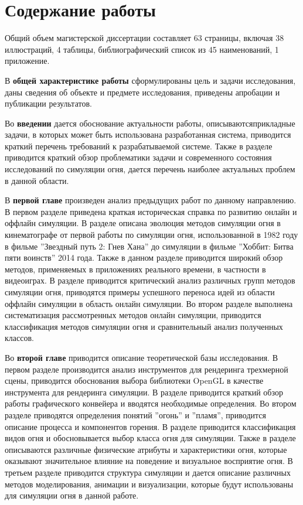 \part*{Содержание работы}

Общий объем магистерской диссертации составляет 63 страницы, включая 38
иллюстраций, 4 таблицы, библиографический список из 45 наименований, 1
приложение.

В \textbf{общей характеристике работы} сформулированы цель и задачи
исследования, даны сведения об объекте и предмете исследования, приведены
апробации и публикации результатов.

Во \textbf{введении} дается обоснование актуальности работы,
описываются\break{}прикладные задачи, в которых может быть использована
разработанная система, приводится краткий перечень требований к разрабатываемой
системе. Также в разделе приводится краткий обзор проблематики задачи и
современного состояния исследований по симуляции огня, дается перечень наиболее
актуальных проблем в данной области.

В \textbf{первой главе} произведен анализ предыдущих работ по данному
направлению. В первом разделе приведена краткая историческая справка по развитию
онлайн и оффлайн симуляции. В разделе описана эволюция методов симуляции огня в
кинематографе от первой работы по симуляции огня, использованной в 1982 году в
фильме ''Звездный путь 2: Гнев Хана'' до симуляции в фильме ''Хоббит: Битва пяти
воинств'' 2014 года. Также в данном разделе приводится широкий обзор методов,
применяемых в приложениях реального времени, в частности в видеоиграх. В разделе
приводится критический анализ различных групп методов симуляции огня, приводятся
примеры успешного переноса идей из области оффлайн симуляции в область онлайн
симуляции. Во втором разделе выполнена систематизация рассмотренных методов
онлайн симуляции, приводится классификация методов симуляции огня и
сравнительный анализ полученных классов.

Во \textbf{второй главе} приводится описание теоретической базы исследования.
В первом разделе производится анализ инструментов для рендеринга трехмерной
сцены, приводится обоснования выбора библиотеки OpenGL в качестве инструмента
для рендеринга симуляции. В разделе приводится краткий обзор работы графического
конвейера и вводятся необходимые определения. Во втором разделе
приводятся определения понятий ''огонь'' и ''пламя'', приводится описание
процесса и компонентов горения. В разделе приводится
классификация видов огня и обосновывается выбор класса огня для симуляции. Также
в разделе описываются различные физические атрибуты и характеристики огня,
которые оказывают значительное влияние на поведение и визуальное восприятие
огня. В третьем разделе приводится структура симуляции и дается описание
различных методов моделирования, анимации и визуализации, которые будут
использованы для симуляции огня в данной работе.

